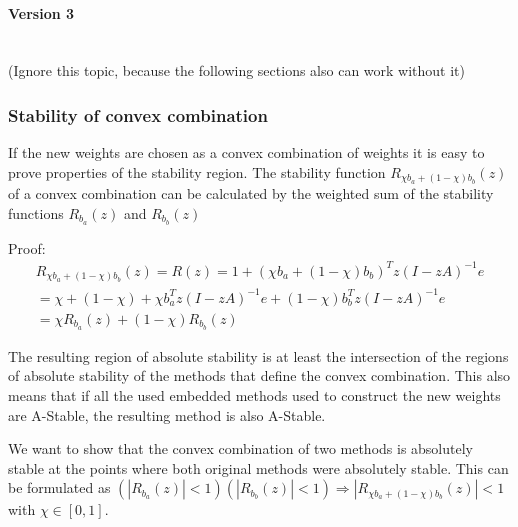\documentclass[a4paper]{scrartcl}
\numberwithin{equation}{section}
\theoremstyle{plain}
\theoremstyle{definition}
\numberwithin{theorem}{section}
\newcommand{\1}{\mathbbm{1}}
\begin{document}
\paragraph*{Version 3} $ $\\
(Ignore this topic, because the following sections also can work without it)



\subsubsection{Stability of convex combination}
If the new weights are chosen as a convex combination of weights it is easy to prove properties of the stability region.
The stability function $R_{\chi b_a + (1-\chi) b_b}(z)$ of a convex combination can be calculated by the weighted sum of the stability functions $R_{b_a}(z)$ and $R_{b_b}(z)$

Proof:
\begin{multline}
R_{\chi b_a + (1-\chi) b_b}(z) = R(z) = 1 + (\chi b_a + (1-\chi) b_b)^Tz(I - zA)^{-1}e \\
= \chi + (1-\chi) + \chi b_a ^Tz(I - zA)^{-1}e + (1-\chi) b_b^Tz(I - zA)^{-1}e \\
= \chi R_{b_a}(z) + (1-\chi) R_{b_b}(z)
\end{multline}

The resulting region of absolute stability is at least the intersection of the regions of absolute stability of the methods that define the convex combination. This also means that if all the used embedded methods used to construct the new weights are A-Stable, the resulting method is also A-Stable.

We want to show that the convex combination of two methods is absolutely stable at the points where both original methods were absolutely stable.
This can be formulated as $(|R_{b_a}(z)|  < 1) (|R_{b_b}(z)| < 1) \Rightarrow |R_{\chi b_a +(1- \chi) b_b}(z)| < 1$ with $\chi \in [0,1]$.
\end{document}
